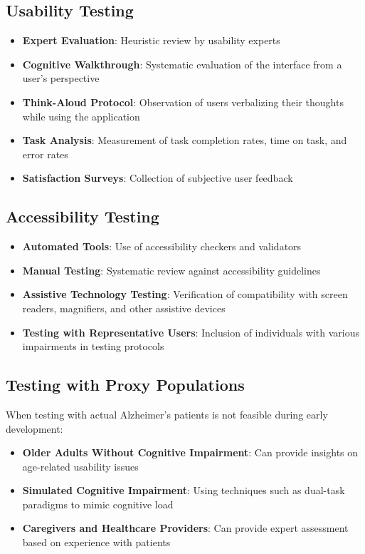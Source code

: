 \subsection{Usability Testing}
\begin{itemize}
    \item \textbf{Expert Evaluation}: Heuristic review by usability experts
    \item \textbf{Cognitive Walkthrough}: Systematic evaluation of the interface from a user's perspective
    \item \textbf{Think-Aloud Protocol}: Observation of users verbalizing their thoughts while using the application
    \item \textbf{Task Analysis}: Measurement of task completion rates, time on task, and error rates
    \item \textbf{Satisfaction Surveys}: Collection of subjective user feedback
\end{itemize}

\subsection{Accessibility Testing}
\begin{itemize}
    \item \textbf{Automated Tools}: Use of accessibility checkers and validators
    \item \textbf{Manual Testing}: Systematic review against accessibility guidelines
    \item \textbf{Assistive Technology Testing}: Verification of compatibility with screen readers, magnifiers, and other assistive devices
    \item \textbf{Testing with Representative Users}: Inclusion of individuals with various impairments in testing protocols
\end{itemize}

\subsection{Testing with Proxy Populations}
When testing with actual Alzheimer's patients is not feasible during early development:
\begin{itemize}
    \item \textbf{Older Adults Without Cognitive Impairment}: Can provide insights on age-related usability issues
    \item \textbf{Simulated Cognitive Impairment}: Using techniques such as dual-task paradigms to mimic cognitive load
    \item \textbf{Caregivers and Healthcare Providers}: Can provide expert assessment based on experience with patients
\end{itemize}

